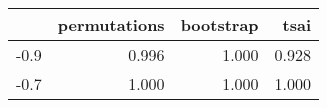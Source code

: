 \begin{table}[ht]
\centering
\begingroup\tiny
\begin{tabular}{rrrr}
  \hline
 & permutations & bootstrap & tsai \\ 
  \hline
-0.9 & 0.996 & 1.000 & 0.928 \\ 
  -0.7 & 1.000 & 1.000 & 1.000 \\ 
   \hline
\end{tabular}
\endgroup
\end{table}
